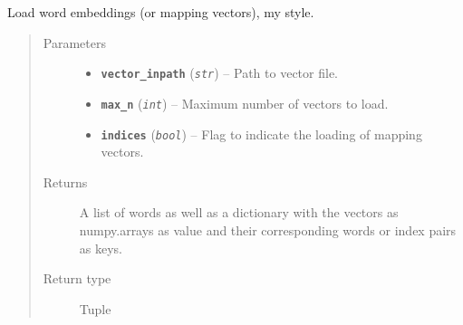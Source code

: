 \documentclass[letterpaper,10pt,english]{sphinxmanual}
\begin{document}
\begin{fulllineitems}
\label{src.misc:src.misc.helpers.load_vectors_from_model}
Load word embeddings (or mapping vectors), my style.
\begin{quote}\begin{description}
\item[{Parameters}] \leavevmode\begin{itemize}
\item {} 
\textbf{\texttt{vector\_inpath}} (\emph{\texttt{str}}) -- Path to vector file.

\item {} 
\textbf{\texttt{max\_n}} (\emph{\texttt{int}}) -- Maximum number of vectors to load.

\item {} 
\textbf{\texttt{indices}} (\emph{\texttt{bool}}) -- Flag to indicate the loading of mapping vectors.

\end{itemize}

\item[{Returns}] \leavevmode
A list of words as well as a dictionary with the vectors as numpy.arrays as value and their
corresponding words or index pairs as keys.

\item[{Return type}] \leavevmode
Tuple

\end{description}\end{quote}

\end{fulllineitems}

\end{document}
